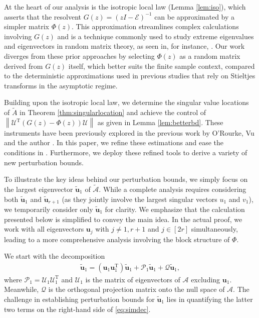 \documentclass[reqno]{amsart}
\newcommand{\T}{\mathrm{T}}
\theoremstyle{plain}
\theoremstyle{definition}
\begin{document}
At the heart of our analysis is the isotropic local law (Lemma \ref{lem:iso}), which asserts that the resolvent $G(z)=(zI - \mathcal E)^{-1}$ can be approximated by a simpler matrix $\Phi(z)$. This approximation streamlines complex calculations involving $G(z)$ and is a technique commonly used to study extreme eigenvalues and eigenvectors in random matrix theory, as seen in, for instance, \cite{BEKYY14, KY, BDW21,BDWW20}. Our work diverges from these prior approaches by selecting $\Phi(z)$ as a random matrix derived from $G(z)$ itself, which better suits the finite sample context, compared to the deterministic approximations used in previous studies that rely on Stieltjes transforms in the asymptotic regime.

Building upon the isotropic local law, we determine the singular value locations of $\widetilde A$ in Theorem \ref{thm:singularlocation} and achieve the control of $\left\|  \mathcal U^\T \left(G(z)-\Phi(z) \right) \mathcal U \right\|$ as given in Lemma \ref{lem:betterbd}. These instruments have been previously explored in the previous work by O'Rourke, Vu and the author \cite{OVW22}. In this paper, we refine these estimations and ease the conditions in \cite{OVW22}. Furthermore, we deploy these refined tools to derive a variety of new perturbation bounds.

To illustrate the key ideas behind our perturbation bounds, we simply focus on the largest eigenvector $\widetilde{\mathbf u}_1$ of $\widetilde{\mathcal A}$. While a complete analysis requires considering both $\widetilde{\mathbf u}_1$ and $\widetilde{\mathbf u}_{r+1}$ (as they jointly involve the largest singular vectors $u_1$ and $v_1$), we temporarily consider only $\widetilde{\mathbf u}_1$ for clarity. We emphasize that the calculation presented below is simplified to convey the main idea. In the actual proof, we work with all eigenvectors $\mathbf{u}_j$ with $j\neq 1, r+1$ and $j\in [2r]$ simultaneously, leading to a more comprehensive analysis involving the block structure of $\Phi$.

We start with the decomposition 
\begin{align}\label{eq:simdec}
\widetilde{\mathbf u}_1 = ({\mathbf u}_1 {\mathbf u}_1^\T )\widetilde{\mathbf u}_1 + \mathcal P_1 \widetilde{\mathbf u}_1 + \mathcal Q \widetilde{\mathbf u}_1,
\end{align}
where $ \mathcal P_1 = \mathcal U_1 \mathcal U_1^\T$ and $\mathcal U_1$ is the matrix of eigenvectors of $\mathcal A$ excluding ${\mathbf u}_1$.  Meanwhile, $\mathcal Q$ is the orthogonal projection matrix onto the null space of $\mathcal A$. The challenge in establishing perturbation bounds for $\widetilde{\mathbf u}_1$ lies in quantifying the latter two terms on the right-hand side of \eqref{eq:simdec}. 
\end{document}
